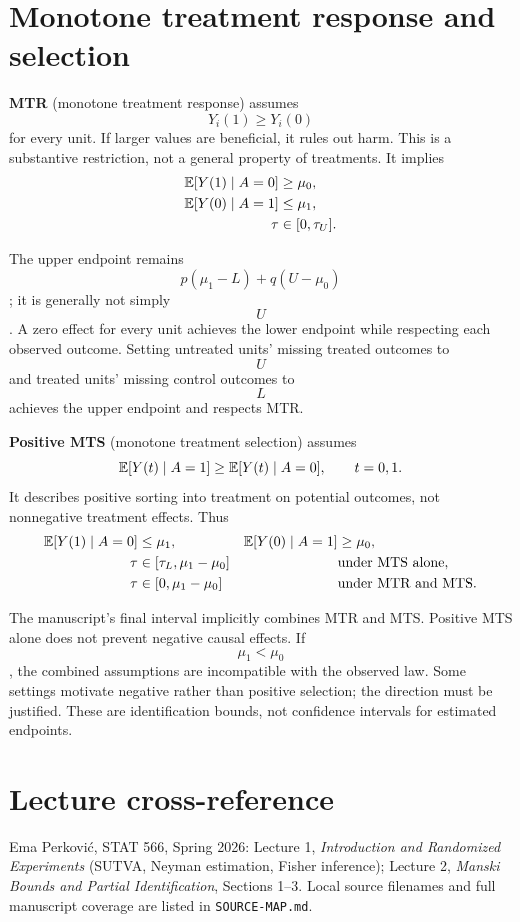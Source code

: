 \section{Monotone treatment response and selection}
\textbf{MTR} (monotone treatment response) assumes $$Y_i(1)\geq Y_i(0)$$ for every unit. If larger values are beneficial, it rules out harm. This is a substantive restriction, not a general property of treatments. It implies
\begin{align}
\mathbb E[Y(1)\mid A=0]&\geq\mu_0,\\
\mathbb E[Y(0)\mid A=1]&\leq\mu_1,\\
\tau&\in[0,\tau_U].
\end{align}
\begin{todo}
The upper endpoint remains $$p(\mu_1-L)+q(U-\mu_0)$$; it is generally not simply $$U$$. A zero effect for every unit achieves the lower endpoint while respecting each observed outcome. Setting untreated units' missing treated outcomes to $$U$$ and treated units' missing control outcomes to $$L$$ achieves the upper endpoint and respects MTR.
\end{todo}
\textbf{Positive MTS} (monotone treatment selection) assumes
\begin{equation}
\mathbb E[Y(t)\mid A=1]\geq\mathbb E[Y(t)\mid A=0],\qquad t=0,1.
\end{equation}
It describes positive sorting into treatment on potential outcomes, not nonnegative treatment effects. Thus
\begin{align}
\mathbb E[Y(1)\mid A=0]&\leq\mu_1, & \mathbb E[Y(0)\mid A=1]&\geq\mu_0,\\
\tau&\in[\tau_L,\mu_1-\mu_0] &&\text{under MTS alone},\\
\tau&\in[0,\mu_1-\mu_0] &&\text{under MTR and MTS}.
\end{align}
\begin{correction}
The manuscript's final interval implicitly combines MTR and MTS. Positive MTS alone does not prevent negative causal effects. If $$\mu_1<\mu_0$$, the combined assumptions are incompatible with the observed law. Some settings motivate negative rather than positive selection; the direction must be justified. These are identification bounds, not confidence intervals for estimated endpoints.
\end{correction}
\section*{Lecture cross-reference}
Ema Perkovi\'c, STAT 566, Spring 2026: Lecture 1, \emph{Introduction and Randomized Experiments} (SUTVA, Neyman estimation, Fisher inference); Lecture 2, \emph{Manski Bounds and Partial Identification}, Sections 1--3. Local source filenames and full manuscript coverage are listed in \texttt{SOURCE-MAP.md}.
